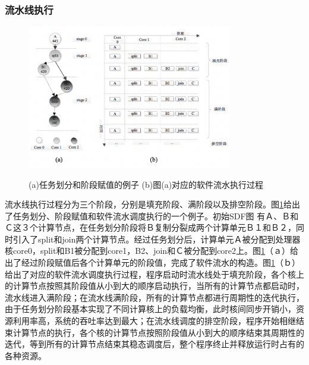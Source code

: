 \subsubsection{流水线执行}

\begin{figure}[htbp]
  \centering
  \includegraphics[width=0.8\textwidth]{Img/Chap_Application/Yu/streamline.png}\\
  \caption{(a)任务划分和阶段赋值的例子 (b)图(a)对应的软件流水执行过程}\label{fig:streamline}
\end{figure}

流水线执行过程分为三个阶段，分别是填充阶段、满阶段以及排空阶段。图\ref{fig:streamline}给出了任务划分、阶段赋值和软件流水调度执行的一个例子。初始SDF图 有Ａ、Ｂ和Ｃ这３个计算节点，在任务划分阶段将Ｂ复制分裂成两个计算单元Ｂ１和Ｂ２，同时引入了split和join两个计算节点。经过任务划分后，计算单元Ａ被分配到处理器核core0，split和B1被分配到core1，B2、join和Ｃ被分配到core2上。图\ref{fig:streamline}（ａ）给出了经过阶段赋值后各个计算单元的阶段值，完成了软件流水的构造。图\ref{fig:streamline}（ｂ）给出了对应的软件流水调度执行过程，程序启动时流水线处于填充阶段，各个核上的计算节点按照其阶段值从小到大的顺序启动执行，当所有的计算节点都启动时，流水线进入满阶段；在流水线满阶段，所有的计算节点都进行周期性的迭代执行，由于任务划分阶段基本实现了不同计算核上的负载均衡，此时核间同步开销小，资源利用率高，系统的吞吐率达到最大；在流水线调度的排空阶段，程序开始相继结束计算节点的执行，各个核的计算节点按照阶段值从小到大的顺序结束其周期性的迭代，等到所有的计算节点结束其稳态调度后，整个程序终止并释放运行时占有的各种资源。

